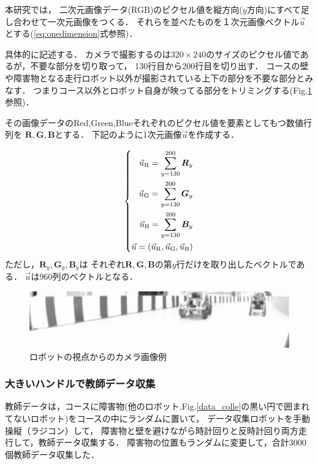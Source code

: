 本研究では，
二次元画像データ(RGB)のピクセル値を縦方向($y$方向)にすべて足し合わせて一次元画像をつくる．
それらを並べたものを１次元画像ベクトル$\vec{u}$とする(\ref{eq:onedimension}式参照)．

具体的に記述する．
カメラで撮影するのは$320 \times 240$のサイズのピクセル値であるが，不要な部分を切り取って，
130行目から200行目を切り出す．
コースの壁や障害物となる走行ロボット以外が撮影されている上下の部分を不要な部分とみなす．
つまりコース以外とロボット自身が映ってる部分をトリミングする(Fig.\ref{roboteye}参照)．



その画像データのRed,Green,Blueそれぞれのピクセル値を要素としてもつ数値行列を
$\boldsymbol R,\boldsymbol G,\boldsymbol B$とする．
下記のように1次元画像$\vec{u}$を作成する．

\vspace{-2mm}
\begin{eqnarray}
\left\{
\begin{aligned}
\vec u_{\rm R}= \sum_{y=130}^{200} \boldsymbol R_{y}\\
\vec u_{\rm G}= \sum_{y=130}^{200} \boldsymbol G_{y}\\
\vec u_{\rm B}= \sum_{y=130}^{200} \boldsymbol B_{y}\\
\vec u = (\vec u_{\rm R}, \vec u_{\rm G}, \vec u_{\rm B}) \\
\end{aligned}
\right.
\label{eq:onedimension}
\end{eqnarray}
ただし，$\boldsymbol R_y, \boldsymbol G_y, \boldsymbol B_y$は
それぞれ$\boldsymbol R, \boldsymbol G, \boldsymbol B$の第$y$行だけを取り出したベクトルである．
$\vec u$は$960$列のベクトルとなる．

\begin{figure}[h]
\centering
\includegraphics[width=0.7\linewidth]{robot_eye.eps}
\caption{ロボットの視点からのカメラ画像例}
\label{roboteye}
\end{figure}


\subsubsection{大きいハンドルで教師データ収集}
教師データは，コースに障害物(他のロボット,Fig.\ref{data_colle}の黒い円で囲まれてないロボット)をコースの中にランダムに置いて，
データ収集ロボットを手動操縦（ラジコン）して，
障害物と壁を避けながら時計回りと反時計回り両方走行して，教師データ収集する．
障害物の位置もランダムに変更して，合計3000個教師データ収集した．

